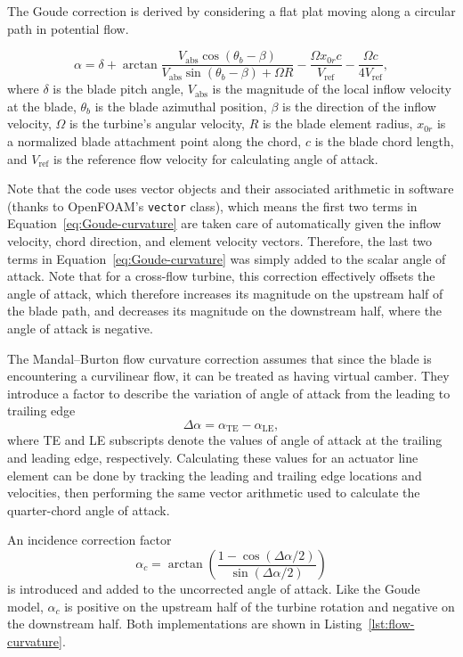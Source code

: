 The Goude correction is derived by considering a flat plat moving along a
circular path in potential flow.

\begin{equation}
    \alpha = \delta + \arctan \frac{V_\mathrm{abs} \cos(\theta_b -
        \beta)}{V_\mathrm{abs} \sin(\theta_b - \beta) + \Omega R} - \frac{\Omega
        x_{0r}c}{V_\mathrm{ref}} - \frac{\Omega c}{4 V_\mathrm{ref}},
    \label{eq:Goude-curvature}
\end{equation}
where $\delta$ is the blade pitch angle, $V_\mathrm{abs}$ is the magnitude of
the local inflow velocity at the blade, $\theta_b$ is the blade azimuthal
position, $\beta$ is the direction of the inflow velocity, $\Omega$ is the
turbine's angular velocity, $R$ is the blade element radius, $x_{0r}$ is a
normalized blade attachment point along the chord, $c$ is the blade chord
length, and $V_\mathrm{ref}$ is the reference flow velocity for calculating
angle of attack.

Note that the code uses vector objects and their associated arithmetic in
software (thanks to OpenFOAM's \texttt{vector} class), which means the first two
terms in Equation~\ref{eq:Goude-curvature} are taken care of automatically given
the inflow velocity, chord direction, and element velocity vectors. Therefore,
the last two terms in Equation~\ref{eq:Goude-curvature} was simply added to the
scalar angle of attack. Note that for a cross-flow turbine, this correction
effectively offsets the angle of attack, which therefore increases its magnitude
on the upstream half of the blade path, and decreases its magnitude on the
downstream half, where the angle of attack is negative.

The Mandal--Burton flow curvature correction assumes that since the blade is
encountering a curvilinear flow, it can be treated as having virtual camber.
They introduce a factor to describe the variation of angle of attack from the
leading to trailing edge
\begin{equation}
    \Delta \alpha = \alpha_\mathrm{TE} - \alpha_\mathrm{LE},
    \label{eq:Mandal-Burton-alpha-diff}
\end{equation}
where TE and LE subscripts denote the values of angle of attack at the trailing
and leading edge, respectively. Calculating these values for an actuator line
element can be done by tracking the leading and trailing edge locations and
velocities, then performing the same vector arithmetic used to calculate the
quarter-chord angle of attack.

An incidence correction factor
\begin{equation}
    \alpha_c = \arctan \left( \frac{1 - \cos (\Delta \alpha / 2)}{\sin (\Delta
        \alpha / 2)} \right)
    \label{eq:Mandal-Burton-alpha-corr}
\end{equation}
is introduced and added to the uncorrected angle of attack. Like the Goude
model, $\alpha_c$ is positive on the upstream half of the turbine rotation and
negative on the downstream half. Both implementations are shown in
Listing~\ref{lst:flow-curvature}.


